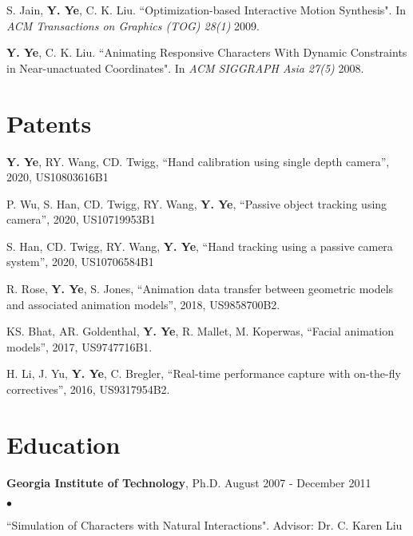 \documentclass[margin,line]{res}
\newenvironment{list2}{
  \begin{list}{$\bullet$}{%
      \setlength{\itemsep}{0in}
      \setlength{\parsep}{0in} \setlength{\parskip}{0in}
      \setlength{\topsep}{0in} \setlength{\partopsep}{0in} 
      \setlength{\leftmargin}{0.2in}}}{\end{list}}
\begin{document}
\begin{resume}
\vspace*{-.1in}
S. Jain, {\bf Y. Ye}, C. K. Liu. ``Optimization-based Interactive Motion Synthesis". In {\em ACM Transactions on Graphics (TOG) 28(1)} 2009. 

\vspace*{-.1in}
{\bf Y. Ye}, C. K. Liu. ``Animating Responsive Characters With Dynamic Constraints in Near-unactuated Coordinates".  In {\em ACM SIGGRAPH Asia 27(5)} 2008.



\section{\sc Patents}

{\bf Y. Ye},  RY. Wang, CD. Twigg, ``Hand calibration using single depth camera'', 2020, US10803616B1

\vspace*{-.1in}
P. Wu, S. Han, CD. Twigg, RY. Wang, {\bf Y. Ye}, ``Passive object tracking using camera'', 2020, US10719953B1

\vspace*{-.1in}
S. Han, CD. Twigg, RY. Wang, {\bf Y. Ye}, ``Hand tracking using a passive camera system'', 2020, US10706584B1

\vspace*{-.1in}
R. Rose, {\bf Y. Ye}, S. Jones, ``Animation data transfer between geometric models and associated animation models'', 2018, US9858700B2. 

\vspace*{-.1in}
KS. Bhat, AR. Goldenthal, {\bf Y. Ye}, R. Mallet, M. Koperwas, ``Facial animation models'', 2017, US9747716B1.  

\vspace*{-.1in}
H. Li, J. Yu, {\bf Y. Ye}, C. Bregler, ``Real-time performance capture with on-the-fly correctives'', 2016, US9317954B2.


\section{\sc Education}
{\bf Georgia Institute of Technology}, Ph.D.  \hfill August 2007 - December 2011 \\
\begin{list2}
\vspace*{-.15in}
\item ``Simulation of Characters with Natural Interactions". Advisor:  Dr. C. Karen Liu
\end{list2}


\end{resume}
\end{document}
